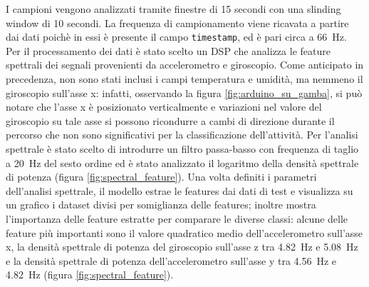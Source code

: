I campioni vengono analizzati tramite finestre di 15 secondi con una slinding window di 10 secondi. La frequenza di campionamento viene ricavata a partire dai dati poichè in essi è presente il campo \texttt{timestamp}, ed è pari circa a \SI{66}{\hertz}.
Per il processamento dei dati è stato scelto un DSP che analizza le feature spettrali dei segnali provenienti da accelerometro e giroscopio. Come anticipato in precedenza, non sono stati inclusi i campi temperatura e umidità, ma nemmeno il giroscopio sull'asse x: infatti, osservando la figura \ref{fig:arduino_su_gamba}, si può notare che l'asse x è posizionato verticalmente e variazioni nel valore del giroscopio su tale asse si possono ricondurre a cambi di direzione durante il percorso che non sono significativi per la classificazione dell'attività.
Per l'analisi spettrale è stato scelto di introdurre un filtro passa-basso con frequenza di taglio a \SI{20}{\hertz} del sesto ordine ed è stato analizzato il logaritmo della densità spettrale di potenza (figura \ref{fig:spectral_feature}). Una volta definiti i parametri dell'analisi spettrale, il modello estrae le features dai dati di test e visualizza su un grafico i dataset divisi per somiglianza delle features; inoltre mostra l'importanza delle feature estratte per comparare le diverse classi: alcune delle feature più importanti sono il valore quadratico medio dell'accelerometro sull'asse x, la densità spettrale di potenza del giroscopio sull'asse z tra \SI{4.82}{\hertz} e \SI{5.08}{\hertz} e la densità spettrale di potenza dell'accelerometro sull'asse y tra \SI{4.56}{\hertz} e \SI{4.82}{\hertz} (figura \ref{fig:spectral_feature}).  

